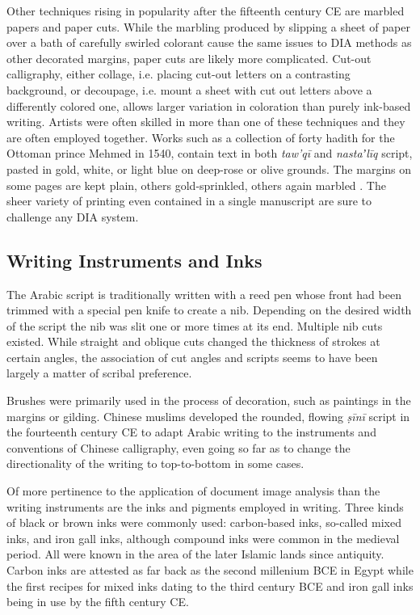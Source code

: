 Other techniques rising in popularity after the fifteenth century CE are
marbled papers and paper cuts. While the marbling produced by slipping a sheet
of paper over a bath of carefully swirled colorant cause the same issues to DIA
methods as other decorated margins, paper cuts are likely more complicated.
Cut-out calligraphy, either collage, i.e. placing cut-out letters on a
contrasting background, or decoupage, i.e. mount a sheet with cut out letters
above a differently colored one, allows larger variation in coloration than
purely ink-based writing. Artists were often skilled in more than one of these
techniques and they are often employed together. Works such as a collection of
forty hadith for the Ottoman prince Mehmed in 1540, contain text in both
\emph{taw'qī} and \emph{nastaʼlīq} script, pasted in gold, white, or light blue
on deep-rose or olive grounds. The margins on some pages are kept plain, others
gold-sprinkled, others again marbled \cite[pg. 52-56]{blair2006islamic}. The
sheer variety of printing even contained in a single manuscript are sure to
challenge any DIA system.

\subsection{Writing Instruments and Inks}

The Arabic script is traditionally written with a reed pen whose front had been
trimmed with a special pen knife to create a nib. Depending on the desired
width of the script the nib was slit one or more times at its end. Multiple nib
cuts existed. While straight and oblique cuts changed the thickness of strokes
at certain angles, the association of cut angles and scripts seems to have been
largely a matter of scribal preference\cite[pg. 42]{gacek2009arabic}.

Brushes were primarily used in the process of decoration, such as paintings in
the margins or gilding. Chinese muslims developed the rounded, flowing
\emph{ṣīnī} script in the fourteenth century CE to adapt Arabic writing to the
instruments and conventions of Chinese calligraphy, even going so far as to
change the directionality of the writing to top-to-bottom in some
cases\cite[pg. 29-30]{ghoname2012sini}.

Of more pertinence to the application of document image analysis than the
writing instruments are the inks and pigments employed in writing. Three kinds
of black or brown inks were commonly used: carbon-based inks, so-called mixed
inks, and iron gall inks, although compound inks were common in the medieval
period\cite[pg. 62-63]{blair2006islamic}. All were known in the area of the
later Islamic lands since antiquity. Carbon inks are attested as far back as
the second millenium BCE in Egypt while the first recipes for mixed inks dating
to the third century BCE and iron gall inks being in use by the fifth century
CE\cite{christiansen2017manufacture}.

